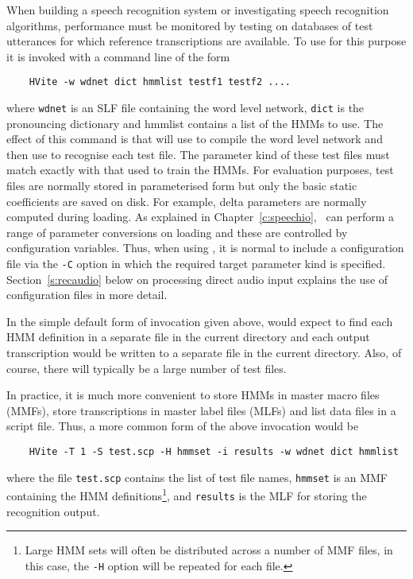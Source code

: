 
When building a speech recognition system or investigating speech
recognition algorithms, performance must be monitored by testing
on databases of test utterances for which reference transcriptions
are available.  To use  for this purpose it is
invoked with a command line of the form
\begin{verbatim}
    HVite -w wdnet dict hmmlist testf1 testf2 ....
\end{verbatim}
where \texttt{wdnet} is an SLF file containing the word level network, 
\texttt{dict} is the pronouncing dictionary and hmmlist contains
a list of the HMMs to use.  The effect of this command is that
 will use  to compile the word level network
and then use  to recognise each test file.   The parameter kind
of these test files must match exactly with that used to train the HMMs.
For evaluation purposes, test files are normally stored in parameterised
form but only the basic static coefficients are saved on disk.  For example,
delta parameters are normally computed during loading.  As explained in
Chapter~\ref{c:speechio}, \HTK\ can perform a range of parameter conversions
on loading and these are controlled by configuration variables.  Thus,
when using , it is normal to include a configuration file
via the \texttt{-C} option in which the required target parameter kind 
is specified.  Section~\ref{s:recaudio} below on processing direct
audio input explains the use of configuration files in more detail.

In the simple
default form of invocation given above,  would
expect to find each HMM definition in a separate file in the current
directory and each
output transcription would be written to a separate file in the current directory.
Also, of course, there will typically be a large number of test files.

In practice, it is much more convenient to store HMMs in master macro files (MMFs),
store transcriptions in master label files (MLFs) and list data files
in a script file.  Thus, a more common form of the above invocation would
be 
\begin{verbatim}
    HVite -T 1 -S test.scp -H hmmset -i results -w wdnet dict hmmlist 
\end{verbatim}
where the file \texttt{test.scp} contains the list of test file names,
\texttt{hmmset} is an MMF containing the HMM definitions\footnote{
Large HMM sets will often be distributed across a number of MMF files,
in this case, the \texttt{-H} option will be repeated for each file.},
and  \texttt{results} is the MLF for storing the recognition output.

